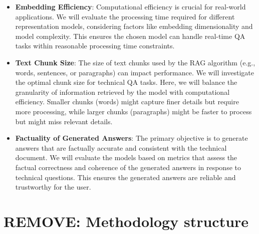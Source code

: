 \begin{itemize}
  \item \textbf{Embedding Efficiency}: Computational efficiency is crucial for real-world applications. We will evaluate the processing time required for different representation models, considering factors like embedding dimensionality and model complexity. This ensures the chosen model can handle real-time \ac{QA} tasks within reasonable processing time constraints.
  \item \textbf{Text Chunk Size}: The size of text chunks used by the \ac{RAG} algorithm (e.g., words, sentences, or paragraphs) can impact performance. We will investigate the optimal chunk size for technical \ac{QA} tasks. Here, we will balance the granularity of information retrieved by the model with computational efficiency. Smaller chunks (words) might capture finer details but require more processing, while larger chunks (paragraphs) might be faster to process but might miss relevant details.  
  \item \textbf{Factuality of Generated Answers}:  The primary objective is to generate answers that are factually accurate and consistent with the technical document. We will evaluate the models based on metrics that assess the factual correctness and coherence of the generated answers in response to technical questions. This ensures the generated answers are reliable and trustworthy for the user.
\end{itemize}


\section{REMOVE: Methodology structure}


